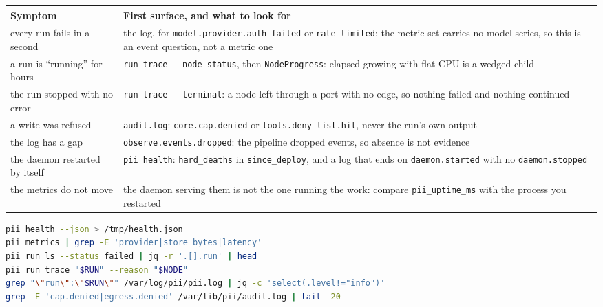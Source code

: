 \begin{longtable}{@{}>{\raggedright\arraybackslash}p{}>{\raggedright\arraybackslash}p{}@{}}
  \toprule
  \textbf{Symptom} & \textbf{First surface, and what to look for} \\
  \midrule
  \endhead
  every run fails in a second & the log, for \texttt{model.provider.auth\_failed} or
    \texttt{rate\_limited}; the metric set carries no model series, so this is an event
    question, not a metric one \\
  a run is \enquote{running} for hours & \texttt{run trace -{}-node-status}, then
    \texttt{NodeProgress}: elapsed growing with flat CPU is a wedged child \\
  the run stopped with no error & \texttt{run trace -{}-terminal}: a node left through a port
    with no edge, so nothing failed and nothing continued \\
  a write was refused & \texttt{audit.log}: \texttt{core.cap.denied} or
    \texttt{tools.deny\_list.hit}, never the run's own output \\
  the log has a gap & \texttt{observe.events.dropped}: the pipeline dropped events, so absence
    is not evidence \\
  the daemon restarted by itself & \texttt{pii health}: \texttt{hard\_deaths} in
    \texttt{since\_deploy}, and a log that ends on \texttt{daemon.started} with no
    \texttt{daemon.stopped} \\
  the metrics do not move & the daemon serving them is not the one running the work: compare
    \texttt{pii\_uptime\_ms} with the process you restarted \\
  \bottomrule
\end{longtable}

\begin{lstlisting}[language=bash]
pii health --json > /tmp/health.json
pii metrics | grep -E 'provider|store_bytes|latency'
pii run ls --status failed | jq -r '.[].run' | head
pii run trace "$RUN" --reason "$NODE"
grep "\"run\":\"$RUN\"" /var/log/pii/pii.log | jq -c 'select(.level!="info")'
grep -E 'cap.denied|egress.denied' /var/lib/pii/audit.log | tail -20
\end{lstlisting}